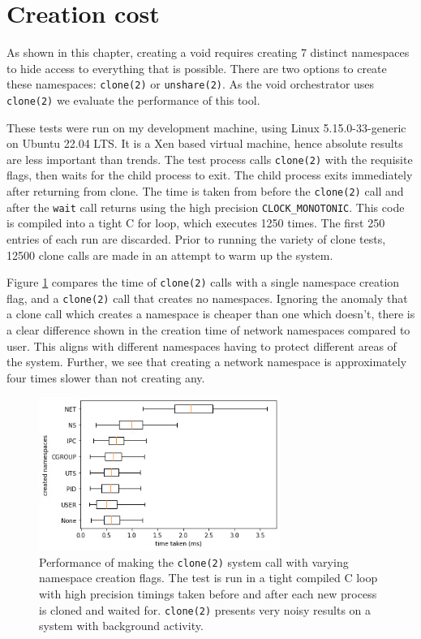 \documentclass[12pt,a4paper,twoside]{report}
\begin{document}
\section{Creation cost}
\label{sec:void-creation-costs}

As shown in this chapter, creating a void requires creating 7 distinct namespaces to hide access to everything that is possible. There are two options to create these namespaces: \texttt{clone(2)} or \texttt{unshare(2)}. As the void orchestrator uses \texttt{clone(2)} we evaluate the performance of this tool.

These tests were run on my development machine, using Linux 5.15.0-33-generic on Ubuntu 22.04 LTS. It is a Xen based virtual machine, hence absolute results are less important than trends. The test process calls \texttt{clone(2)} with the requisite flags, then waits for the child process to exit. The child process exits immediately after returning from clone. The time is taken from before the \texttt{clone(2)} call and after the \texttt{wait} call returns using the high precision \texttt{CLOCK\_MONOTONIC}. This code is compiled into a tight C for loop, which executes 1250 times. The first 250 entries of each run are discarded. Prior to running the variety of clone tests, 12500 clone calls are made in an attempt to warm up the system.

Figure \ref{fig:namespace-times} compares the time of \texttt{clone(2)} calls with a single namespace creation flag, and a \texttt{clone(2)} call that creates no namespaces. Ignoring the anomaly that a clone call which creates a namespace is cheaper than one which doesn't, there is a clear difference shown in the creation time of network namespaces compared to user. This aligns with different namespaces having to protect different areas of the system. Further, we see that creating a network namespace is approximately four times slower than not creating any.

\begin{figure}
    \centering
    \includegraphics[width=0.7\textwidth]{graphs/namespace_times.png}

    \caption{Performance of making the \texttt{clone(2)} system call with varying namespace creation flags. The test is run in a tight compiled C loop with high precision timings taken before and after each new process is cloned and waited for. \texttt{clone(2)} presents very noisy results on a system with background activity.}
    \label{fig:namespace-times}
\end{figure}
\end{document}
